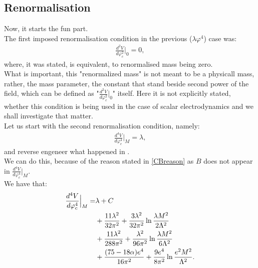 \subsection{Renormalisation}\label{CW_renormalisation_scalar_el}
Now, it starts the fun part. \\
The first imposed renormalisation condition in the previous ($\lambda\varphi^4$) case was:
\begin{align}
\frac{d^2V}{d\varphi_c^2}\Big|_0=0,
\end{align}
where, it was stated, is equivalent, to renormalised mass being zero. \\
What is important, this "renormalized mass" is not meant to be a physicall mass, rather, 
the mass parameter, the constant that stand beside second power of the field, 
which can be defined as "$\frac{d^2V}{d\varphi_c^2}\Big|_0$" itself.
Here it is not explicitly stated, whether this condition is being used in the case of scalar 
electrodynamics and we shall investigate that matter. \\
Let us start with the second renormalisation condition, namely:
\begin{align}
\frac{d^4V}{d\varphi_c^4}\Big|_M=\lambda,
\end{align}
and reverse engeneer what happened in \cite{Coleman1973}. \\
We can do this, because of the reason stated in \ref{CBreason} as $B$ does not appear in 
$\frac{d^4V}{d\varphi_c^4}\Big|_M$. \\
We have that:
\begin{align}
\frac{d^4V}{d\varphi_c^4}\Big|_M = &\lambda + C \notag \\
&+\frac{11\lambda^2}{32\pi^2}+\frac{3\lambda^2}{32\pi^2}\ln\frac{\lambda M^2}{2\Lambda^2}\notag \\
&+\frac{11\lambda^2}{288\pi^2}+\frac{\lambda^2}{96\pi^2}\ln\frac{\lambda M^2}{6\Lambda^2}\notag \\
&+\frac{(75-18\alpha)e^4}{16\pi^2}+\frac{9e^4}{8\pi^2}\ln\frac{e^2M^2}{\Lambda^2}. 
\end{align}
